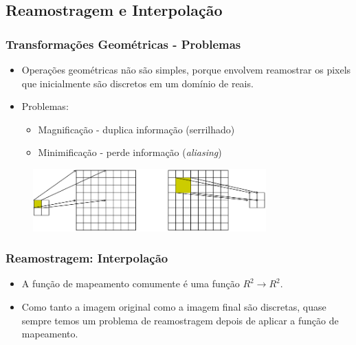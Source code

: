 \documentclass{beamer}
\begin{document}
\subsection{Reamostragem e Interpolação}
\begin{frame}
\frametitle{Transformações Geométricas - Problemas}
\begin{itemize}
 \item Operações geométricas não são simples, porque envolvem reamostrar os
pixels que inicialmente são discretos em um domínio de reais.
 \item Problemas:
 \begin{itemize}
  \item Magnificação - duplica informação (serrilhado)
  \item Minimificação - perde informação (\textit{aliasing})
 \end{itemize}
\end{itemize}
\begin{figure}[ht!]
  \centering
  \includegraphics[width=0.8\textwidth]{img/resize.png}
\end{figure}
\end{frame}

\begin{frame}
  \frametitle{Reamostragem: Interpolação}
\begin{itemize}
 \item A função de mapeamento comumente é uma função $R^2 \rightarrow R^2$.
 \item Como tanto a imagem original como a imagem final são discretas, quase
sempre temos um problema de reamostragem depois de aplicar a função de
mapeamento.
\end{itemize}
\pause
\begin{center}
\end{center}
\end{frame}
\end{document}
